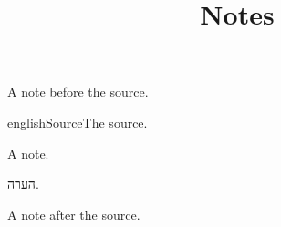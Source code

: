 \documentclass{article}
\title{Notes}\author{}\date{}
\begin{document}
\maketitle
\begin{hearah}A note before the source.\end{hearah}
\begin{mekor}
\begin{mekorlang}{english}{Source}The source.\end{mekorlang}
\end{mekor}
\begin{hearah}A note.\end{hearah}
\begin{hearah}[hebrew]הערה.\end{hearah}
\begin{hearah}A note after the source.\end{hearah}
\end{document}
